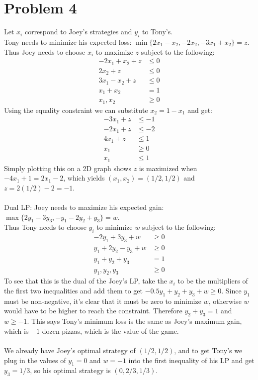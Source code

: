 \documentclass[11pt]{article}
\begin{document}
\section*{Problem 4}
Let $x_i$ correspond to Joey's strategies and $y_i$ to Tony's. \\
Tony needs to minimize his expected loss: $\min\{2x_1-x_2,-2x_2,-3x_1+x_2\}=z$. \\
Thus Joey needs to choose $x_i$ to maximize $z$ subject to the following:
\begin{align*}
-2x_1+x_2+z &\leq 0 \\
2x_2+z &\leq 0 \\
3x_1-x_2+z &\leq 0 \\
x_1+x_2 &= 1 \\
x_1,x_2 &\geq 0
\end{align*}
Using the equality constraint we can substitute $x_2=1-x_1$ and get:
\begin{align*}
-3x_1+z &\leq -1 \\
-2x_1+z &\leq -2 \\
4x_1+z &\leq 1 \\
x_1 &\geq 0 \\
x_1 &\leq 1
\end{align*}
Simply plotting this on a 2D graph shows $z$ is maximized when $-4x_1+1=2x_1-2$, which yields $(x_1,x_2)=(1/2,1/2)$ and $z=2(1/2)-2=-1$. \\\\
Dual LP: Joey needs to maximize his expected gain: $\max\{2y_1-3y_3,-y_1-2y_2+y_3\}=w$. \\
Thus Tony needs to choose $y_i$ to minimize $w$ subject to the following:
\begin{align*}
-2y_1+3y_3+w &\geq 0 \\
y_1+2y_2-y_3+w &\geq 0 \\
y_1+y_2+y_3 &= 1 \\
y_1,y_2,y_3 &\geq 0
\end{align*}
To see that this is the dual of the Joey's LP, take the $x_i$ to be the multipliers of the first two inequalities and add them to get $-0.5y_1+y_2+y_3+w \geq 0$. Since $y_1$ must be non-negative, it's clear that it must be zero to minimize $w$, otherwise $w$ would have to be higher to reach the constraint. Therefore $y_2+y_3=1$ and $w \geq -1$. This says Tony's minimum loss is the same as Joey's maximum gain, which is $-1$ dozen pizzas, which is the value of the game. \\\\
We already have Joey's optimal strategy of $(1/2,1/2)$, and to get Tony's we plug in the values of $y_1=0$ and $w=-1$ into the first inequality of his LP and get $y_3=1/3$, so his optimal strategy is $(0,2/3,1/3)$.
\end{document}
